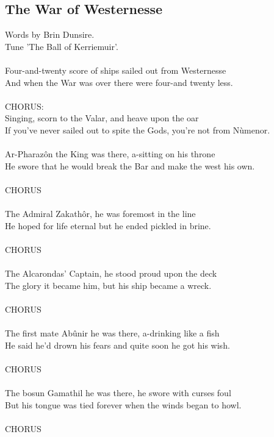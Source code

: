 \begin{multicols}{2}
\section{The War of Westernesse}
Words by Brin Dunsire.
\\
Tune 'The Ball of Kerriemuir'.
\\
\\
Four-and-twenty score of ships sailed out from Westernesse
\\
And when the War was over there were four-and twenty less.
\\
\\CHORUS:\\
Singing, scorn to the Valar, and heave upon the oar
\\
If you’ve never sailed out to spite the Gods, you’re not from N\`umenor.
\\
\\
Ar-Pharaz\^on the King was there, a-sitting on his throne
\\
He swore that he would break the Bar and make the west his own.
\\
\\CHORUS
\\
\\
The Admiral Zakath\^or, he was foremost in the line
\\
He hoped for life eternal but he ended pickled in brine.
\\
\\CHORUS
\\
\\
The Alcarondas’ Captain, he stood proud upon the deck
\\
The glory it became him, but his ship became a wreck.
\\
\\CHORUS
\\
\\
The first mate Ab\^unir he was there, a-drinking like a fish
\\
He said he’d drown his fears and quite soon he got his wish.
\\
\\CHORUS
\\
\\
The bosun Gamathil he was there, he swore with curses foul
\\
But his tongue was tied forever when the winds began to howl.
\\
\\CHORUS
\\

\end{multicols}
